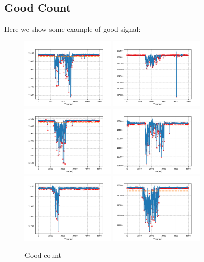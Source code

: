 \documentclass[a4paper,twoside,openany]{book}
\begin{document}
		\subsection{Good Count}
Here we show some example of good signal:
\begin{figure}[H]
\centering
\includegraphics[width=0.4\textwidth, height=0.3\textwidth]{Buona}
\includegraphics[width=0.4\textwidth, height=0.3\textwidth]{Buona2}
\includegraphics[width=0.4\textwidth, height=0.3\textwidth]{Buona3}
\includegraphics[width=0.4\textwidth, height=0.3\textwidth]{Buona4}
\includegraphics[width=0.4\textwidth, height=0.3\textwidth]{Buona5}
\includegraphics[width=0.4\textwidth, height=0.3\textwidth]{Buona6}
\caption{Good count}
\end{figure}
\end{document}
